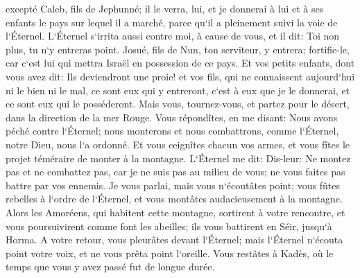 \verse excepté Caleb, fils de Jephunné; il le verra, lui, et je donnerai à lui et à ses enfants le pays sur lequel il a marché, parce qu`il a pleinement suivi la voie de l`Éternel. 
\verse L`Éternel s`irrita aussi contre moi, à cause de vous, et il dit: Toi non plus, tu n`y entreras point. 
\verse Josué, fils de Nun, ton serviteur, y entrera; fortifie-le, car c`est lui qui mettra Israël en possession de ce pays. 
\verse Et vos petits enfants, dont vous avez dit: Ils deviendront une proie! et vos fils, qui ne connaissent aujourd`hui ni le bien ni le mal, ce sont eux qui y entreront, c`est à eux que je le donnerai, et ce sont eux qui le posséderont. 
\verse Mais vous, tournez-vous, et partez pour le désert, dans la direction de la mer Rouge. 
\verse Vous répondîtes, en me disant: Nous avons péché contre l`Éternel; nous monterons et nous combattrons, comme l`Éternel, notre Dieu, nous l`a ordonné. Et vous ceignîtes chacun vos armes, et vous fîtes le projet téméraire de monter à la montagne. 
\verse L`Éternel me dit: Dis-leur: Ne montez pas et ne combattez pas, car je ne suis pas au milieu de vous; ne vous faites pas battre par vos ennemis. 
\verse Je vous parlai, mais vous n`écoutâtes point; vous fûtes rebelles à l`ordre de l`Éternel, et vous montâtes audacieusement à la montagne. 
\verse Alors les Amoréens, qui habitent cette montagne, sortirent à votre rencontre, et vous poursuivirent comme font les abeilles; ils vous battirent en Séir, jusqu`à Horma. 
\verse A votre retour, vous pleurâtes devant l`Éternel; mais l`Éternel n`écouta point votre voix, et ne vous prêta point l`oreille. 
\verse Vous restâtes à Kadès, où le temps que vous y avez passé fut de longue durée. 

